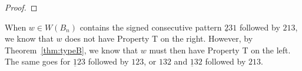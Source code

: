 \begin{proposition}
\begin{proof}
\end{proof}	
\end{proposition}

\begin{remark}
When $w \in W(B_n)$ contains the signed consecutive pattern $\underline{2}31$ followed by $213$, we know that $w$ does not have Property T on the right. However, by Theorem~\ref{thm:typeB}, we know that $w$ must then have Property T on the left. The same goes for $\underline{1}23$ followed by $123$, or $132$ and $\underline{1}32$ followed by $213$.	
\end{remark}





